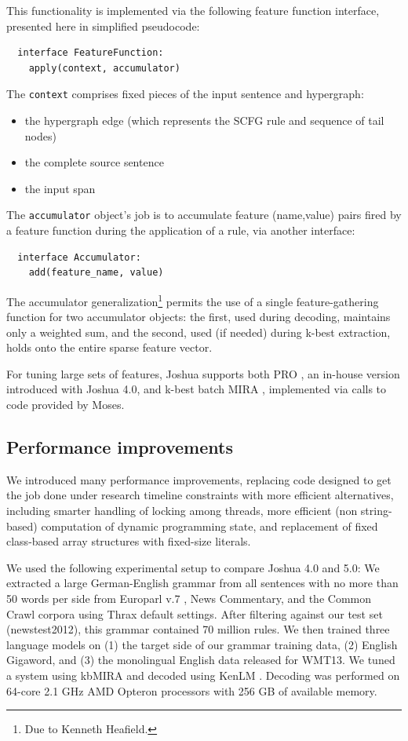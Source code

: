 \documentclass[11pt]{article}
\begin{document}
This functionality is implemented via the following feature function
interface, presented here in simplified pseudocode:
%
\begin{verbatim}
  interface FeatureFunction:
    apply(context, accumulator)
\end{verbatim}
%
The \verb|context| comprises fixed pieces of the input sentence and
hypergraph:
%
\begin{itemize}
\item the hypergraph edge (which represents the SCFG rule and sequence
  of tail nodes)
\item the complete source sentence
\item the input span
\end{itemize}
%
The \verb|accumulator| object's job is to accumulate feature
(name,value) pairs fired by a feature function during the application of a
rule, via another interface:
%
\begin{verbatim}
  interface Accumulator:
    add(feature_name, value)
\end{verbatim}
%
The accumulator generalization\footnote{Due to Kenneth Heafield.}
permits the use of a single feature-gathering function for two
accumulator objects: the first, used during decoding, maintains only a
weighted sum, and the second, used (if needed) during k-best
extraction, holds onto the entire sparse feature vector.

For tuning large sets of features, Joshua supports both PRO
\cite{PRO2011}, an in-house version introduced with Joshua 4.0, and
k-best batch MIRA \cite{cherry2012batch}, implemented via calls to
code provided by Moses.

\subsection{Performance improvements}
\label{sec:performance}

We introduced many performance improvements, replacing code designed
to get the job done under research timeline constraints with more
efficient alternatives, including smarter handling of locking among
threads, more efficient (non string-based) computation of dynamic
programming state, and replacement of fixed class-based array
structures with fixed-size literals.

We used the following experimental setup to compare Joshua 4.0 and
5.0: We extracted a large German-English grammar from all sentences
with no more than 50 words per side from Europarl v.7
\cite{koehn2005europarl}, News Commentary, and the Common Crawl
corpora using Thrax default settings.  After filtering against our
test set (newstest2012), this grammar contained 70 million rules.  We
then trained three language models on (1) the target side of our
grammar training data, (2) English Gigaword, and (3) the monolingual
English data released for WMT13. We tuned a system using kbMIRA and
decoded using KenLM \cite{KenLM}.  Decoding was performed on 64-core
2.1 GHz AMD Opteron processors with 256 GB of available memory.
\end{document}
